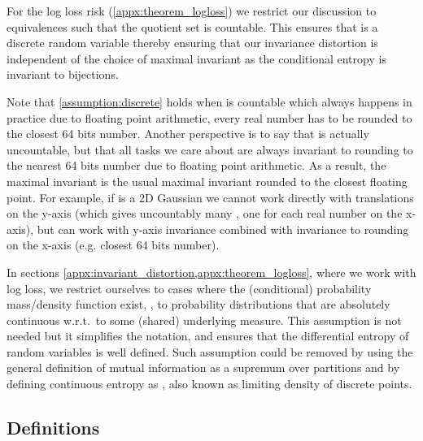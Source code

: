 \documentclass[final]{article}
\begin{document}
\begin{assumption} 
\label{assumption:discrete} 
For the log loss risk (\cref{appx:theorem_logloss}) we restrict our discussion to equivalences  such that the quotient set  is countable.
This ensures that  is a discrete random variable thereby ensuring that our invariance distortion  is independent of the choice of maximal invariant  as the conditional entropy is  invariant to bijections.
\end{assumption}

Note that \cref{assumption:discrete}  holds when  is countable which always happens in practice due to floating point arithmetic, \ie every real number has to be rounded to the closest 64 bits number.
Another perspective is to say that  is actually uncountable, but that all tasks we care about are always invariant to rounding to the nearest 64 bits number due to floating point arithmetic.
As a result, the maximal invariant is the usual maximal invariant rounded to the closest floating point. 
For example, if  is a 2D Gaussian we cannot work directly with translations on the y-axis (which gives uncountably many , one for each real number on the x-axis), but can work with y-axis invariance combined with invariance to rounding on the x-axis (e.g. closest 64 bits number).

\begin{assumption}\label{assumption:density} 
In sections \cref{appx:invariant_distortion,appx:theorem_logloss}, where we work with log loss, we restrict ourselves to cases where the (conditional) probability mass/density function exist, \ie, to probability distributions that are absolutely continuous w.r.t.\ to some (shared) underlying measure.
This assumption is not needed but it simplifies the notation, and ensures that the differential entropy of random variables is well defined.
Such assumption could be removed by using the general definition of mutual information as a supremum over partitions and by defining continuous entropy as  \cite{kolmogorov_shannon_1956,pinsker_information_1964}, also known as  limiting density of discrete points.
\end{assumption}

\subsection{Definitions}
\label{appx:definitions}
\end{document}
